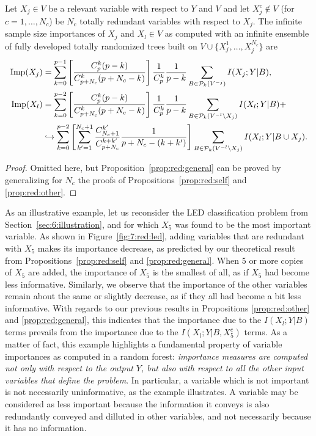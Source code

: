 \begin{proposition}\label{prop:red:general}
Let $X_j\in V$ be a relevant variable with respect to $Y$ and $V$ and let
$X_j^c \notin V$ (for $c=1,\dots,N_c$) be $N_c$ totally redundant variables with respect to $X_j$.
The infinite sample size importances of $X_j$ and $X_l \in V$ as computed with an infinite
ensemble of fully developed totally randomized trees built on $V\cup
\{X_j^1,\dots,X_j^{N_c}\}$ are
\begin{align*}
\text{Imp}(X_j)  &= \sum_{k=0}^{p-1} \left[ \frac{C^k_p (p-k)}{C^k_{p+N_c}(p+N_c-k)}  \right] \frac{1}{C_p^k} \frac{1}{p-k} \sum_{B \in {\cal P}_k(V^{-j})} I(X_j;Y|B), \\
\text{Imp}(X_l) &= \sum_{k=0}^{p-2} \left[ \frac{C^k_p (p-k)}{C^k_{p+N_c}(p+N_c-k)}  \right] \frac{1}{C_p^k} \frac{1}{p-k} \sum_{B \in {\cal P}_k(V^{-l} \setminus X_j)} I(X_l;Y|B) + \\
                & \hookrightarrow \sum_{k=0}^{p-2}  \left[ \sum_{k'=1}^{N_c+1} \frac{C^{k'}_{N_c+1}}{C_{p+N_c}^{k+k'}} \frac{1}{p+N_c-(k+k')} \right]  \sum_{B \in {\cal P}_k(V^{-l}\setminus X_j)} I(X_l;Y|B\cup X_j).
\end{align*}
\end{proposition}

\begin{proof}
Omitted here, but Proposition~\ref{prop:red:general} can be proved
by generalizing for $N_c$ the proofs of Propositions~\ref{prop:red:self}
and \ref{prop:red:other}.
\end{proof}

As an illustrative example, let us reconsider the LED classification problem
from Section~\ref{sec:6:illustration}, and for which $X_5$ was found to be the
most important variable. As shown in Figure~\ref{fig:7:red:led}, adding
variables that are redundant with $X_5$ makes its importance decrease, as
predicted by our theoretical result from Propositions~\ref{prop:red:self} and
\ref{prop:red:general}. When 5 or more copies of $X_5$ are added, the
importance of $X_5$ is the smallest of all, as if $X_5$ had become less
informative. Similarly, we observe that the importance of the other variables
remain about the same or slightly decrease, as if they all had become a bit
less informative. With regards to our previous results in Propositions
\ref{prop:red:other} and \ref{prop:red:general}, this indicates that the
importance due to the $I(X_l;Y|B)$ terms prevails from  the importance due to
the $I(X_l;Y|B,X_5^c)$ terms. As a matter of fact, this example highlights a
fundamental property of variable importances as computed in a random forest:
\textit{importance measures are computed not only with respect to the output $Y$, but
also with respect to all the other input variables that define the problem}. In
particular, a variable which is not important is not necessarily uninformative,
as the example illustrates. A variable may be considered as less important
because the  information it conveys is also redundantly conveyed and dilluted in other
variables, and not necessarily because it has no information.

